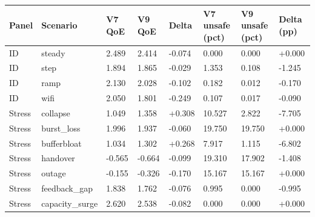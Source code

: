 \begin{tabular}{llllllll}
\toprule
Panel & Scenario & V7 QoE & V9 QoE & Delta & V7 unsafe (pct) & V9 unsafe (pct) & Delta (pp) \\
\midrule
ID & steady & 2.489 & 2.414 & -0.074 & 0.000 & 0.000 & +0.000 \\
ID & step & 1.894 & 1.865 & -0.029 & 1.353 & 0.108 & -1.245 \\
ID & ramp & 2.130 & 2.028 & -0.102 & 0.182 & 0.012 & -0.170 \\
ID & wifi & 2.050 & 1.801 & -0.249 & 0.107 & 0.017 & -0.090 \\
Stress & collapse & 1.049 & 1.358 & +0.308 & 10.527 & 2.822 & -7.705 \\
Stress & burst\_loss & 1.996 & 1.937 & -0.060 & 19.750 & 19.750 & +0.000 \\
Stress & bufferbloat & 1.034 & 1.302 & +0.268 & 7.917 & 1.115 & -6.802 \\
Stress & handover & -0.565 & -0.664 & -0.099 & 19.310 & 17.902 & -1.408 \\
Stress & outage & -0.155 & -0.326 & -0.170 & 15.167 & 15.167 & +0.000 \\
Stress & feedback\_gap & 1.838 & 1.762 & -0.076 & 0.995 & 0.000 & -0.995 \\
Stress & capacity\_surge & 2.620 & 2.538 & -0.082 & 0.000 & 0.000 & +0.000 \\
\bottomrule
\end{tabular}
